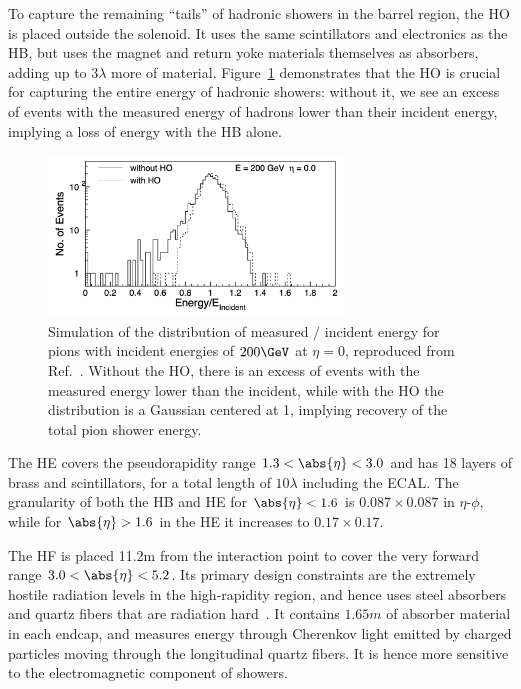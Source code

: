 To capture the remaining ``tails'' of hadronic showers in the barrel region, the HO is placed outside the solenoid.
It uses the same scintillators and electronics as the HB, but uses the magnet and return yoke materials themselves as absorbers, adding up to $3\lambda$ more of material. 
Figure~\ref{fig:02_cms_hcal_ho} demonstrates that the HO is crucial for capturing the entire energy of hadronic showers: without it, we see an excess of events with the measured energy of hadrons lower than their incident energy, implying a loss of energy with the HB alone.

\begin{figure}[ht]
    \centering
    \includegraphics[width=0.7\textwidth]{figures/02-CMS/cms/components/hcal_ho_energy.png}
    \caption[Simulation of the distribution of measured $/$ incident energy for pions with incident energies of $200\GeV$ at $\eta = 0$, reproduced from Ref.~\cite{CMS:2008xjf}.]{Simulation of the distribution of measured $/$ incident energy for pions with incident energies of $200\GeV$ at $\eta = 0$, reproduced from Ref.~\cite{CMS:2008xjf}.
    Without the HO, there is an excess of events with the measured energy lower than the incident, while with the HO the distribution is a Gaussian centered at 1, implying recovery of the total pion shower energy.}
    \label{fig:02_cms_hcal_ho}
\end{figure}

The HE covers the pseudorapidity range $1.3 < \abs{\eta} < 3.0$ and has 18 layers of brass and scintillators, for a total length of $10\lambda$ including the ECAL.
The granularity of both the HB and HE for $\abs{\eta} < 1.6$ is $0.087\times0.087$ in $\eta$-$\phi$, while for $\abs{\eta} > 1.6$ in the HE it increases to $0.17\times0.17$.

The HF is placed 11.2\unit{m} from the interaction point to cover the very forward range $3.0 < \abs{\eta} < 5.2$.
Its primary design constraints are the extremely hostile radiation levels in the high-rapidity region, and hence uses steel absorbers and quartz fibers that are radiation hard~\cite{Penzo:2009zz}.
It contains $1.65\unit{m}$ of absorber material in each endcap, and measures energy through Cherenkov light emitted by charged particles moving through the longitudinal quartz fibers.
It is hence more sensitive to the electromagnetic component of showers.

